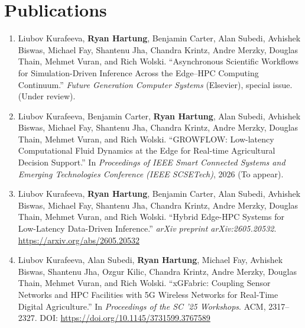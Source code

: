 \documentclass[letterpaper,11pt]{article}
\begin{document}
\section{Publications}
  \begin{small}
    \begin{enumerate}[align=left, itemindent=0pt]
      \item[{[2026]}] Liubov Kurafeeva, \textbf{Ryan Hartung}, Benjamin Carter, Alan Subedi, Avhishek Biswas, Michael Fay, Shantenu Jha, Chandra Krintz, Andre Merzky, Douglas Thain, Mehmet Vuran, and Rich Wolski. ``Asynchronous Scientific Workflows for Simulation-Driven Inference Across the Edge--HPC Computing Continuum.'' \textit{Future Generation Computer Systems} (Elsevier), special issue. (Under review).
      \item[{[2026]}] Liubov Kurafeeva, Benjamin Carter, \textbf{Ryan Hartung}, Alan Subedi, Avhishek Biswas, Michael Fay, Shantenu Jha, Chandra Krintz, Andre Merzky, Douglas Thain, Mehmet Vuran, and Rich Wolski. ``GROWFLOW: Low-latency Computational Fluid Dynamics at the Edge for Real-time Agricultural Decision Support.'' In \textit{Proceedings of IEEE Smart Connected Systems and Emerging Technologies Conference (IEEE SCSETech)}, 2026 (To appear).
      \item[{[2026]}] Liubov Kurafeeva, \textbf{Ryan Hartung}, Benjamin Carter, Alan Subedi, Avhishek Biswas, Michael Fay, Shantenu Jha, Chandra Krintz, Andre Merzky, Douglas Thain, Mehmet Vuran, and Rich Wolski. ``Hybrid Edge-HPC Systems for Low-Latency Data-Driven Inference.'' \textit{arXiv preprint arXiv:2605.20532}. \url{https://arxiv.org/abs/2605.20532}
      \item[{[2025]}] Liubov Kurafeeva, Alan Subedi, \textbf{Ryan Hartung}, Michael Fay, Avhishek Biswas, Shantenu Jha, Ozgur Kilic, Chandra Krintz, Andre Merzky, Douglas Thain, Mehmet Vuran, and Rich Wolski. ``xGFabric: Coupling Sensor Networks and HPC Facilities with 5G Wireless Networks for Real-Time Digital Agriculture.'' In \textit{Proceedings of the SC '25 Workshops}. ACM, 2317--2327. DOI: \url{https://doi.org/10.1145/3731599.3767589}
    \end{enumerate}
  \end{small}
\end{document}
